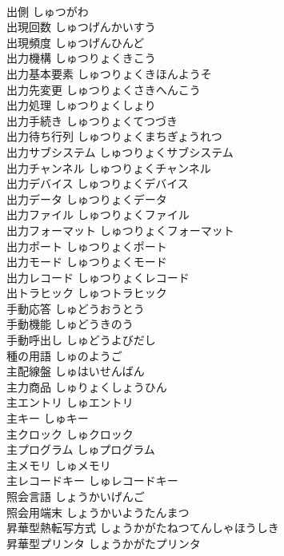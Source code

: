 \documentclass[8pt]{extreport}
\begin{document}
\begin{CJK}{UTF8}{min}
\\	出側	しゅつがわ	
\\	出現回数	しゅつげんかいすう	
\\	出現頻度	しゅつげんひんど	
\\	出力機構	しゅつりょくきこう	
\\	出力基本要素	しゅつりょくきほんようそ	
\\	出力先変更	しゅつりょくさきへんこう	
\\	出力処理	しゅつりょくしょり	
\\	出力手続き	しゅつりょくてつづき	
\\	出力待ち行列	しゅつりょくまちぎょうれつ	
\\	出力サブシステム	しゅつりょくサブシステム	
\\	出力チャンネル	しゅつりょくチャンネル	
\\	出力デバイス	しゅつりょくデバイス	
\\	出力データ	しゅつりょくデータ	
\\	出力ファイル	しゅつりょくファイル	
\\	出力フォーマット	しゅつりょくフォーマット	
\\	出力ポート	しゅつりょくポート	
\\	出力モード	しゅつりょくモード	
\\	出力レコード	しゅつりょくレコード	
\\	出トラヒック	しゅつトラヒック	
\\	手動応答	しゅどうおうとう	
\\	手動機能	しゅどうきのう	
\\	手動呼出し	しゅどうよびだし	
\\	種の用語	しゅのようご	
\\	主配線盤	しゅはいせんばん	
\\	主力商品	しゅりょくしょうひん	
\\	主エントリ	しゅエントリ	
\\	主キー	しゅキー	
\\	主クロック	しゅクロック	
\\	主プログラム	しゅプログラム	
\\	主メモリ	しゅメモリ	
\\	主レコードキー	しゅレコードキー	
\\	照会言語	しょうかいげんご	
\\	照会用端末	しょうかいようたんまつ	
\\	昇華型熱転写方式	しょうかがたねつてんしゃほうしき	
\\	昇華型プリンタ	しょうかがたプリンタ	

\end{CJK}
\end{document}
